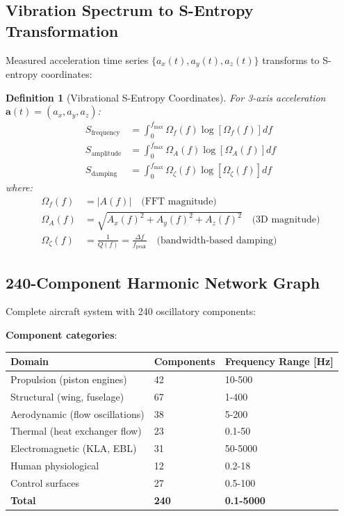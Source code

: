 \documentclass[12pt,a4paper]{article}
\newtheorem{definition}{Definition}
\begin{document}
\subsection{Vibration Spectrum to S-Entropy Transformation}

Measured acceleration time series $\{a_x(t), a_y(t), a_z(t)\}$ transforms to S-entropy coordinates:

\begin{definition}[Vibrational S-Entropy Coordinates]
For 3-axis acceleration $\mathbf{a}(t) = (a_x, a_y, a_z)$:
\begin{align}
S_{\text{frequency}} &= \int_0^{f_{\text{max}}} \Omega_f(f) \log[\Omega_f(f)] df \\
S_{\text{amplitude}} &= \int_0^{f_{\text{max}}} \Omega_A(f) \log[\Omega_A(f)] df \\
S_{\text{damping}} &= \int_0^{f_{\text{max}}} \Omega_{\zeta}(f) \log[\Omega_{\zeta}(f)] df
\end{align}
where:
\begin{align}
\Omega_f(f) &= |A(f)| \quad \text{(FFT magnitude)} \\
\Omega_A(f) &= \sqrt{A_x(f)^2 + A_y(f)^2 + A_z(f)^2} \quad \text{(3D magnitude)} \\
\Omega_{\zeta}(f) &= \frac{1}{Q(f)} = \frac{\Delta f}{f_{\text{peak}}} \quad \text{(bandwidth-based damping)}
\end{align}
\end{definition}

\subsection{240-Component Harmonic Network Graph}

Complete aircraft system with 240 oscillatory components:

\textbf{Component categories}:
\begin{center}
\begin{tabular}{|l|l|l|}
\hline
\textbf{Domain} & \textbf{Components} & \textbf{Frequency Range [Hz]} \\
\hline
Propulsion (piston engines) & 42 & 10-500 \\
Structural (wing, fuselage) & 67 & 1-400 \\
Aerodynamic (flow oscillations) & 38 & 5-200 \\
Thermal (heat exchanger flow) & 23 & 0.1-50 \\
Electromagnetic (KLA, EBL) & 31 & 50-5000 \\
Human physiological & 12 & 0.2-18 \\
Control surfaces & 27 & 0.5-100 \\
\hline
\textbf{Total} & \textbf{240} & \textbf{0.1-5000} \\
\hline
\end{tabular}
\end{center}
\end{document}
